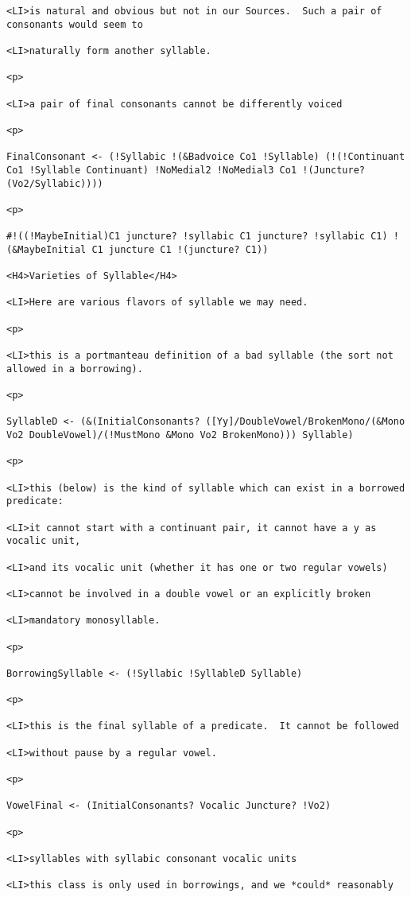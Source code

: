 \documentclass[12pt]{article}
\begin{document}
\begin{lstlisting}
<LI>is natural and obvious but not in our Sources.  Such a pair of consonants would seem to

<LI>naturally form another syllable.

<p>

<LI>a pair of final consonants cannot be differently voiced

<p>

FinalConsonant <- (!Syllabic !(&Badvoice Co1 !Syllable) (!(!Continuant Co1 !Syllable Continuant) !NoMedial2 !NoMedial3 Co1 !(Juncture? (Vo2/Syllabic))))

<p>

#!((!MaybeInitial)C1 juncture? !syllabic C1 juncture? !syllabic C1) !(&MaybeInitial C1 juncture C1 !(juncture? C1))

<H4>Varieties of Syllable</H4>

<LI>Here are various flavors of syllable we may need.

<p>

<LI>this is a portmanteau definition of a bad syllable (the sort not allowed in a borrowing).

<p>

SyllableD <- (&(InitialConsonants? ([Yy]/DoubleVowel/BrokenMono/(&Mono Vo2 DoubleVowel)/(!MustMono &Mono Vo2 BrokenMono))) Syllable)

<p>

<LI>this (below) is the kind of syllable which can exist in a borrowed predicate:

<LI>it cannot start with a continuant pair, it cannot have a y as vocalic unit,

<LI>and its vocalic unit (whether it has one or two regular vowels)

<LI>cannot be involved in a double vowel or an explicitly broken

<LI>mandatory monosyllable.

<p>

BorrowingSyllable <- (!Syllabic !SyllableD Syllable)

<p>

<LI>this is the final syllable of a predicate.  It cannot be followed

<LI>without pause by a regular vowel.

<p>

VowelFinal <- (InitialConsonants? Vocalic Juncture? !Vo2)

<p>

<LI>syllables with syllabic consonant vocalic units

<LI>this class is only used in borrowings, and we *could* reasonably


\end{lstlisting}
\end{document}
